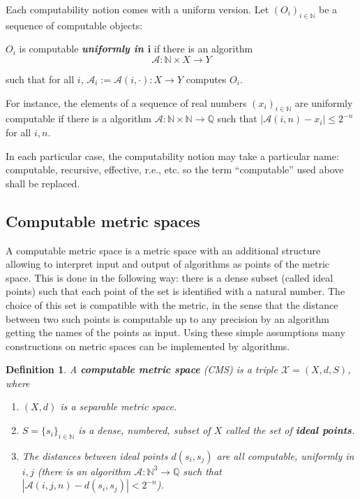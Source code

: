 \documentclass[copyright,creativecommons]{eptcs}
\newtheorem{definition}{Definition}
\numberwithin{equation}{section}
\begin{document}
\smallskip

Each computability notion comes with a uniform version. Let $(O_i)_{i\in \mathbb{N}}$ be a sequence of computable objects:

\smallskip

\begin{center}
$O_i$ is computable \textbf{\emph{uniformly in $\boldsymbol{i}$}} if there
is an algorithm
\begin{equation*}
\mathcal{A}:\mathbb{N}\times X \to Y
\end{equation*}

such that for all $i$, $\mathcal{A}_i:= \mathcal{A}(i,\cdot):X\to Y$
computes $O_i$.
\end{center}

\smallskip


For instance, the elements of a sequence of real numbers $(x_i)_{i\in\mathbb{N}}$ are uniformly computable if there is a algorithm $\mathcal{A}:\mathbb{N}\times\mathbb{N}\to\mathbb{Q}$ such that $|\mathcal{A}(i,n)-x_i|\leq 2^{-n}$
for all $i,n$.

In each particular case, the computability notion may take a particular
name: computable, recursive, effective, r.e., etc. so the term
``computable'' used above shall be replaced. 
\subsection{Computable metric spaces\label{CMS}}

A computable metric space is a metric space with an additional structure
allowing to interpret input and output of algorithms as points of the metric
space. This is done in the following way: there is a dense subset (called
ideal points) such that each point of the set is identified with a natural
number. The choice of this set is compatible with the metric, in the sense
that the distance between two such points is computable up to any precision
by an algorithm getting the names of the points as input. Using these simple
assumptions many constructions on metric spaces can be implemented by
algorithms.

\begin{definition}
A \textbf{\emph{computable metric space}} (CMS) is a triple $\mathcal{X}=(X,d,S)$, where

\begin{enumerate}
\item[(i)] $(X,d)$ is a separable metric space.

\item[(ii)] $S=\{s_{i}\}_{i\in \mathbb{N}}$ is a dense, numbered, subset of $X$ called the set of \textbf{\emph{ideal points}}.

\item[(iii)] The distances between ideal points $d(s_{i},s_{j})$ are all
computable, uniformly in $i,j$ (there is an algorithm $\mathcal{A}:\mathbb{N}^3\to \mathbb{Q}$ such that $|\mathcal{A}(i,j,n)-d(s_i,s_j)|<2^{-n}$).
\end{enumerate}
\end{definition}
\end{document}
